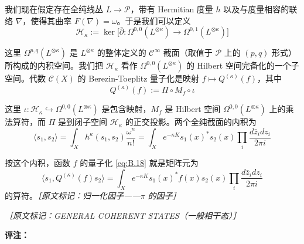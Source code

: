 我们现在假定存在全纯线丛 $L\to\mathcal{P}$，带有 Hermitian 度量 $h$ 以及与度量相容的联络 $\nabla$，使得其曲率 $F(\nabla)=\omega$。于是我们可以定义
\begin{equation}
  \mathcal{H}_\kappa:=\ker\big[\bar\partial:\Omega^{0,0}(L^{\otimes\kappa})\to\Omega^{0,1}(L^{\otimes\kappa})\big]
  \tag{B.17}
  \label{eq:B.17}
\end{equation}

这里 $\Omega^{p,q}(L^{\otimes\kappa})$ 是 $L^{\otimes\kappa}$ 的整体定义的 $\mathcal{C}^\infty$ 截面（取值于 $\mathcal{P}$ 上的 $(p,q)$ 形式）所构成的内积空间。我们把 $\mathcal{H}_\kappa$ 看作 $\Omega^{0,0}(L^{\otimes\kappa})$ 的 Hilbert 空间完备化的一个子空间。代数 $\mathcal{C}(X)$ 的 Berezin-Toeplitz 量子化是映射 $f\mapsto Q^{(\kappa)}(f)$，其中
\begin{equation}
  Q^{(\kappa)}(f):=\Pi\circ M_f\circ\iota
  \tag{B.18}
  \label{eq:B.18}
\end{equation}

这里 $\iota:\mathcal{H}_\kappa\hookrightarrow\Omega^{0,0}(L^{\otimes\kappa})$ 是包含映射，$M_f$ 是 Hilbert 空间 $\Omega^{0,0}(L^{\otimes\kappa})$ 上的乘法算符，而 $\Pi$ 是到闭子空间 $\mathcal{H}_\kappa$ 的正交投影。两个全纯截面的内积为
\begin{equation}
  \langle s_1,s_2\rangle=\int_X h^\kappa(s_1,s_2)\frac{\omega^n}{n!}
  =\int_X e^{-\kappa K}s_1(x)^*s_2(x)\prod_i\frac{d\bar z_idz_i}{2\pi i}
  \tag{B.19}
  \label{eq:B.19}
\end{equation}

按这个内积，函数 $f$ 的量子化 \eqref{eq:B.18} 就是矩阵元为
\begin{equation}
  \langle s_1,Q^{(\kappa)}(f)s_2\rangle=\int_X e^{-\kappa K}s_1(x)^*f(x)s_2(x)\prod_i\frac{d\bar z_idz_i}{2\pi i}
  \tag{B.20}
  \label{eq:B.20}
\end{equation}
的算符。{\small\itshape ［原文标记：归一化因子——$\pi$ 的因子］}

{\small\itshape ［原文标记：GENERAL COHERENT STATES（一般相干态）］}

\textbf{评注：}

